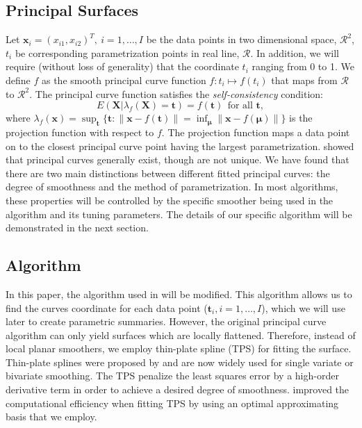 \documentclass[12pt]{article}
\def\bX{\mathbf{X}}
\def\bt{\mathbf{t}}
\def\bx{\mathbf{x}}
\begin{document}
\subsection{Principal Surfaces}
Let $\mathbf{x}_i=(x_{i1},x_{i2})^T,\ i=1,\dots, I$ be the data points in two dimensional space, $\mathcal{R}^2$, $t_i$ be corresponding parametrization points in real line, $\mathcal{R}$. In addition, we will require (without loss of generality) that the coordinate $t_i$ ranging from 0 to 1. We define $f$ as the smooth principal curve function $f: t_i\mapsto f(t_i)$ that maps from $\mathcal{R}$ to $\mathcal{R}^2$. The principal curve function satisfies the {\em self-consistency} condition:
\begin{equation}
E(\bX|\lambda_f(\bX)=\bt)=f(\bt)\ \ \text{for all }\bt,
\end{equation}
where $\lambda_f(\bx)=\sup_{\mathbf{t}}\big\{\mathbf{t}: \|\mathbf{x}-f(\mathbf{t})\|=\inf_{\mathbf{\mu}}\|\mathbf{x}-f(\mathbf{\mu})\| \big\}$ is the projection function with respect to $f$. The projection function maps a data point on to the closest principal curve point having the largest parametrization.
\citeauthor{hastie1989principal} \cite{hastie1989principal} showed that principal curves generally exist, though are not unique. We have found that there are two main distinctions between different fitted principal curves: the degree of smoothness and the method of parametrization. In most algorithms, these properties will be controlled by the specific smoother being used in the algorithm and its tuning parameters. The details of our specific algorithm will be demonstrated in the next section.\

\subsection{Algorithm}
In this paper, the algorithm used in \cite{hastie1989principal} will be modified. This algorithm allows us to find the curves coordinate for each data point ($\mathbf{t}_i, i=1,\dots, I$), which we will use later to create parametric summaries. However, the original principal curve algorithm can only yield surfaces which are locally flattened. Therefore, instead of local planar smoothers, we employ thin-plate spline (TPS) for fitting the surface. Thin-plate splines were proposed by \cite{duchon1977splines} and are now widely used for single variate or bivariate smoothing. The TPS penalize the least squares error by a high-order derivative term in order to achieve a desired degree of smoothness. \citeauthor{wood2003thin} \cite{wood2003thin} improved the computational efficiency when fitting TPS by using an optimal approximating basis that we employ.\
\end{document}
